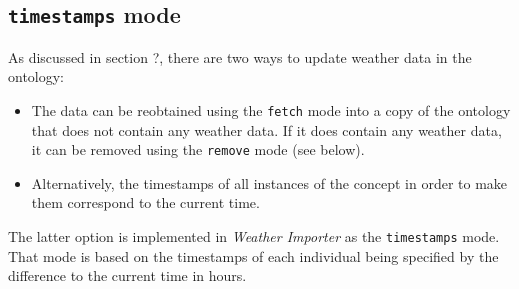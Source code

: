 \subsection{\texttt{timestamps} mode}

As discussed in section ?, there are two ways to update weather data in the \thinkhomeweather ontology:
\begin{itemize}
  \item The data can be reobtained using the \texttt{fetch} mode into a copy of the ontology that does not contain any weather data. If it does contain any weather data, it can be removed using the \texttt{remove} mode (see below).
  \item Alternatively, the timestamps of all instances of the  concept in order to make them correspond to the current time.
\end{itemize}

The latter option is implemented in \emph{Weather Importer} as the \texttt{timestamps} mode. That mode is based on the timestamps of each  individual being specified by the difference to the current time in hours.

